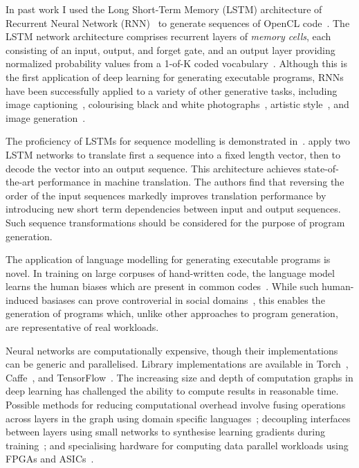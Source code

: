 In past work I used the Long Short-Term Memory (LSTM) architecture of Recurrent Neural Network (RNN)~\cite{Sundermeyer2012,Mikolov2015} to generate sequences of OpenCL code~\cite{Cummins2017a}. The LSTM network architecture comprises recurrent layers of \emph{memory cells}, each consisting of an input, output, and forget gate, and an output layer providing normalized probability values from a 1-of-K coded vocabulary~\cite{Graves,Graves2013}. Although this is the first application of deep learning for generating executable programs, RNNs have been successfully applied to a variety of other generative tasks, including image captioning~\cite{Vinyals}, colourising black and white photographs~\cite{Zhang2016}, artistic style~\cite{Gatys2015}, and image generation~\cite{Gregor2014}.

The proficiency of LSTMs for sequence modelling is demonstrated in~\cite{Sutskever2014}. \citeauthor{Sutskever2014} apply two LSTM networks to translate first a sequence into a fixed length vector, then to decode the vector into an output sequence. This architecture achieves state-of-the-art performance in machine translation. The authors find that reversing the order of the input sequences markedly improves translation performance by introducing new short term dependencies between input and output sequences. Such sequence transformations should be considered for the purpose of program generation.

The application of language modelling for generating executable programs is novel. In training on large corpuses of hand-written code, the language model learns the human biases which are present in common codes~\cite{Caliskan-islam2016}. While such human-induced basiases can prove controverial in social domains~\cite{Bolukbasi2016,Joseph2017}, this enables the generation of programs which, unlike other approaches to program generation, are representative of real workloads.

Neural networks are computationally expensive, though their implementations can be generic and parallelised. Library implementations are available in Torch~\cite{Collobert2011}, Caffe~\cite{Jia2014}, and TensorFlow~\cite{Abadi}. The increasing size and depth of computation graphs in deep learning has challenged the ability to compute results in reasonable time. Possible methods for reducing computational overhead involve fusing operations across layers in the graph using domain specific languages~\cite{Truong2016,Ashari2015a,Potter2015}; decoupling interfaces between layers using small networks to synthesise learning gradients during training~\cite{Jaderberg2016a}; and specialising hardware for computing data parallel workloads using FPGAs and ASICs~\cite{Misra2010}.


